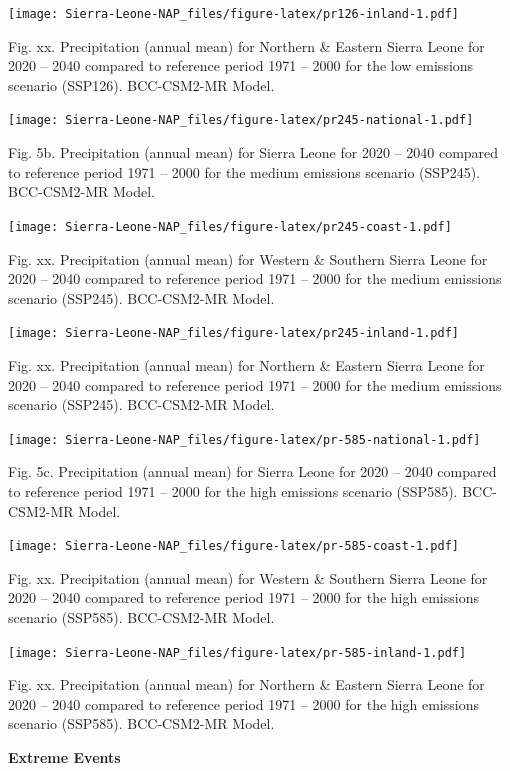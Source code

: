 \documentclass[
]{book}
\begin{document}
\texttt{[image: Sierra-Leone-NAP\_files/figure-latex/pr126-inland-1.pdf]}

Fig. xx. Precipitation (annual mean) for Northern \& Eastern Sierra Leone for 2020 -- 2040 compared to reference period 1971 -- 2000 for the low emissions scenario (SSP126). BCC-CSM2-MR Model.

\texttt{[image: Sierra-Leone-NAP\_files/figure-latex/pr245-national-1.pdf]}

Fig. 5b. Precipitation (annual mean) for Sierra Leone for 2020 -- 2040 compared to reference period 1971 -- 2000 for the medium emissions scenario (SSP245). BCC-CSM2-MR Model.

\texttt{[image: Sierra-Leone-NAP\_files/figure-latex/pr245-coast-1.pdf]}

Fig. xx. Precipitation (annual mean) for Western \& Southern Sierra Leone for 2020 -- 2040 compared to reference period 1971 -- 2000 for the medium emissions scenario (SSP245). BCC-CSM2-MR Model.

\texttt{[image: Sierra-Leone-NAP\_files/figure-latex/pr245-inland-1.pdf]}

Fig. xx. Precipitation (annual mean) for Northern \& Eastern Sierra Leone for 2020 -- 2040 compared to reference period 1971 -- 2000 for the medium emissions scenario (SSP245). BCC-CSM2-MR Model.

\texttt{[image: Sierra-Leone-NAP\_files/figure-latex/pr-585-national-1.pdf]}

Fig. 5c. Precipitation (annual mean) for Sierra Leone for 2020 -- 2040 compared to reference period 1971 -- 2000 for the high emissions scenario (SSP585). BCC-CSM2-MR Model.

\texttt{[image: Sierra-Leone-NAP\_files/figure-latex/pr-585-coast-1.pdf]}

Fig. xx. Precipitation (annual mean) for Western \& Southern Sierra Leone for 2020 -- 2040 compared to reference period 1971 -- 2000 for the high emissions scenario (SSP585). BCC-CSM2-MR Model.

\texttt{[image: Sierra-Leone-NAP\_files/figure-latex/pr-585-inland-1.pdf]}

Fig. xx. Precipitation (annual mean) for Northern \& Eastern Sierra Leone for 2020 -- 2040 compared to reference period 1971 -- 2000 for the high emissions scenario (SSP585). BCC-CSM2-MR Model.

\textbf{Extreme Events}
\end{document}
